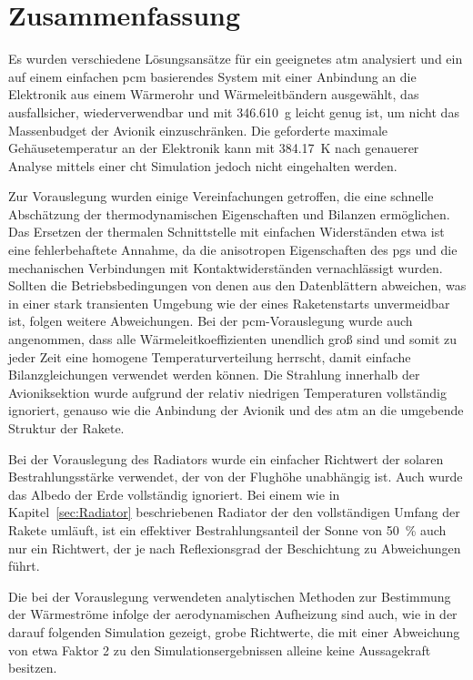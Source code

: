 \chapter{Zusammenfassung}
\label{chap:Zusammenfassung}

Es wurden verschiedene Lösungsansätze für ein geeignetes \ac{atm} analysiert und ein auf einem einfachen \ac{pcm} basierendes System
mit einer Anbindung an die Elektronik aus einem Wärmerohr und Wärmeleitbändern
ausgewählt, das ausfallsicher, wiederverwendbar und mit \SI{346,610}{\gram} leicht genug ist, um nicht das Massenbudget der Avionik einzuschränken.
Die geforderte maximale Gehäusetemperatur an der Elektronik kann mit \SI{384,17}{\kelvin} nach genauerer Analyse mittels einer \ac{cht} Simulation
jedoch nicht eingehalten werden.

Zur Vorauslegung wurden einige Vereinfachungen getroffen, die eine schnelle Abschätzung der thermodynamischen Eigenschaften
und Bilanzen ermöglichen.
Das Ersetzen der thermalen Schnittstelle mit einfachen Widerständen etwa ist eine fehlerbehaftete Annahme, da die anisotropen Eigenschaften des \ac{pgs} und
die mechanischen
Verbindungen mit Kontaktwiderständen vernachlässigt wurden. Sollten die Betriebsbedingungen von denen aus den Datenblättern abweichen, was in einer
stark transienten Umgebung wie der eines Raketenstarts unvermeidbar ist, folgen weitere Abweichungen.
Bei der \ac{pcm}-Vorauslegung wurde auch angenommen, dass alle Wärmeleitkoeffizienten unendlich groß sind und somit zu jeder Zeit
eine homogene Temperaturverteilung herrscht, damit einfache Bilanzgleichungen verwendet werden können.
Die Strahlung innerhalb der Avioniksektion wurde aufgrund der relativ niedrigen Temperaturen vollständig ignoriert, genauso wie
die Anbindung der Avionik und des \ac{atm} an die umgebende Struktur der Rakete.

Bei der Vorauslegung des Radiators wurde ein einfacher Richtwert der solaren Bestrahlungsstärke verwendet, der von der Flughöhe unabhängig ist.
Auch wurde das Albedo der Erde vollständig ignoriert.
Bei einem wie in Kapitel~\ref{sec:Radiator} beschriebenen Radiator der den vollständigen Umfang der Rakete umläuft, ist ein effektiver Bestrahlungsanteil der Sonne von
\SI{50}{\percent} auch nur ein Richtwert, der je nach Reflexionsgrad der Beschichtung zu Abweichungen führt.

Die bei der Vorauslegung verwendeten analytischen Methoden zur Bestimmung der Wärmeströme infolge der aerodynamischen Aufheizung sind auch,
wie in der darauf folgenden Simulation gezeigt, grobe Richtwerte, die mit einer Abweichung von etwa Faktor 2 zu den Simulationsergebnissen
alleine keine Aussagekraft besitzen.

